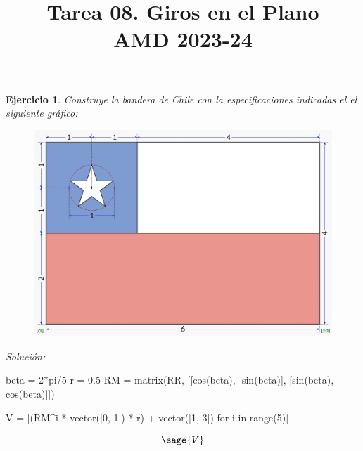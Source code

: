 \documentclass{amsart}
\title{Tarea 08. Giros en el Plano \\ AMD 2023-24}
\newtheorem{ejer}{Ejercicio}
\begin{document}
\maketitle

\begin{ejer}
Construye la bandera de Chile con la especificaciones indicadas el el siguiente gráfico:

\begin{figure}[H]
\centering
\includegraphics[width = 12cm]{Chile.png}
\end{figure}
\end{ejer}

{\it Solución:}


\begin{sageblock}
beta = 2*pi/5
r = 0.5
RM = matrix(RR, [[cos(beta), -sin(beta)], [sin(beta), cos(beta)]])

V = [(RM^i * vector([0, 1]) * r) + vector([1, 3]) for i in range(5)]
\end{sageblock}

$$
\sage{V}
$$

\begin{sagesub}
\end{sagesub}
\end{document}

